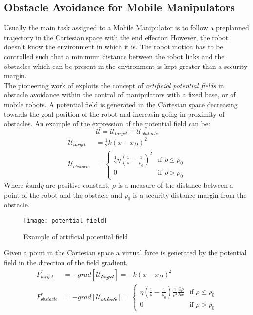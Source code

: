 \subsection{Obstacle Avoidance for Mobile Manipulators}
Usually the main task assigned to a Mobile Manipulator is to follow a preplanned trajectory in the Cartesian space with the end effector. However, the robot doesn't know the environment in which it is. The robot motion has to be controlled such that a minimum distance between the robot links and the obstacles which can be present in the environment is kept greater than a security margin.\\
The pioneering work of \cite{khatib1986} exploits the concept of \textit{artificial potential fields} in obstacle avoidance within the control of manipulators with a fixed base, or of mobile robots. A potential field is generated in the Cartesian space decreasing towards the goal position of the robot and increasin going in proximity of obstacles. An example of the expression of the potential field can be: 
\begin{equation}
	\mathcal{U}=\mathcal{U}_{target}+\mathcal{U}_{obstacle}
\end{equation}
\begin{equation}
	\begin{split}
	\mathcal{U}_{target}&=\frac{1}{2}k\left(x-x_D\right)^2 \\
	\mathcal{U}_{obstacle}&=\begin{cases}
		\frac{1}{2}\eta\left(\frac{1}{\rho}-\frac{1}{\rho_0}\right)^2 & \text{if } \rho\leq\rho_0 \\
		0 & \text{if } \rho>\rho_0
	\end{cases}
	\end{split}
\end{equation}
Where $k \text{and} \eta$ are positive constant, $\rho$ is a measure of the distance between a point of the robot and the obstacle and $\rho_0$ is a security distance margin from the obstacle.
\begin{figure}[h!]
	\centering
	\texttt{[image: potential\_field]}
	\caption{Example of artificial potential field}
\end{figure}
Given a point in the Cartesian space a virtual force is generated by the potential field in the direction of the field gradient. 
\begin{equation}
\begin{split}
F^*_{target}&=-grad\left[\mathcal{U_{target}}\right]=-k\left(x-x_D\right)^2 \\
F^*_{obstacle}&=-grad\left[\mathcal{U_{obstacle}}\right]=\begin{cases}\eta\left(\frac{1}{\rho}-\frac{1}{\rho_0}\right)\frac{1}{\rho^2}\frac{\partial\rho}{\partial x}& \text{if } \rho\leq\rho_0 \\
0 & \text{if } \rho>\rho_0
\end{cases}
\end{split}
\end{equation}
